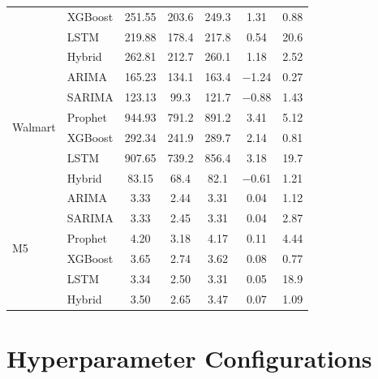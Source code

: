 \documentclass[journal]{IEEEtran}
\begin{document}
\begin{table}[h]
{\begin{tabular}{llccccc}
 & XGBoost & 251.55 & 203.6 & 249.3 &   1.31  & 0.88 \\
 & LSTM    & 219.88 & 178.4 & 217.8 &   0.54  & 20.6 \\
 & Hybrid  & 262.81 & 212.7 & 260.1 &   1.18  & 2.52 \\
\midrule
\multirow{6}{*}{Walmart}
 & ARIMA   & 165.23 & 134.1  & 163.4 & $-$1.24 & 0.27 \\
 & SARIMA  & 123.13 &  99.3  & 121.7 & $-$0.88 & 1.43 \\
 & Prophet & 944.93 & 791.2  & 891.2 &   3.41  & 5.12 \\
 & XGBoost & 292.34 & 241.9  & 289.7 &   2.14  & 0.81 \\
 & LSTM    & 907.65 & 739.2  & 856.4 &   3.18  & 19.7 \\
 & Hybrid  &  83.15 &  68.4  &  82.1 & $-$0.61 & 1.21 \\
\midrule
\multirow{6}{*}{M5}
 & ARIMA   &  3.33 & 2.44 &  3.31 &  0.04 & 1.12 \\
 & SARIMA  &  3.33 & 2.45 &  3.31 &  0.04 & 2.87 \\
 & Prophet &  4.20 & 3.18 &  4.17 &  0.11 & 4.44 \\
 & XGBoost &  3.65 & 2.74 &  3.62 &  0.08 & 0.77 \\
 & LSTM    &  3.34 & 2.50 &  3.31 &  0.05 & 18.9 \\
 & Hybrid  &  3.50 & 2.65 &  3.47 &  0.07 & 1.09 \\
\bottomrule
\end{tabular}%
}
\end{table}

\section{Hyperparameter Configurations}
\label{app:hyper}

\begin{table}[h]
\centering
\caption{Complete Hyperparameter Configurations}
\end{table}
\end{document}

